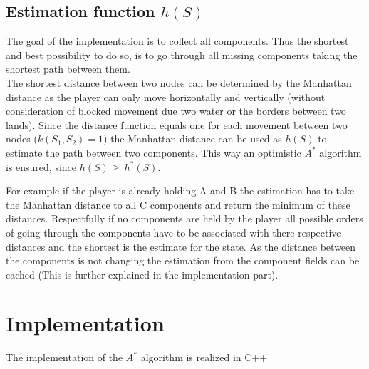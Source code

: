 \documentclass{article}
\begin{document}
\subsection{Estimation function $h(S)$}
The goal of the implementation is to collect all components. Thus the shortest and best possibility to do so, is to go through all missing components taking the shortest path between them. \\
The shortest distance between two nodes can be determined by the Manhattan distance as the player can only move horizontally and vertically (without consideration of blocked movement due two water or the borders between two lands). Since the distance function equals one for each movement between two nodes ($k(S_1, S_2) = 1$) the Manhattan distance can be used as $h(S)$ to estimate the path between two components.
This way an optimistic $A^*$ algorithm is ensured, since $h(S) \geq \ h^*(S)$.

 For example if the player is already holding A and B the estimation has to take the Manhattan distance to all C components and return the minimum of these distances. Respectfully if no components are held by the player all possible orders of going through the components have to be associated with there respective distances and the shortest is the estimate for the state. As the distance between the components is not changing the estimation from the component fields can be cached (This is further explained in the implementation part). %


\section{Implementation}
The implementation of the $A^*$ algorithm is realized in C++
\end{document}
